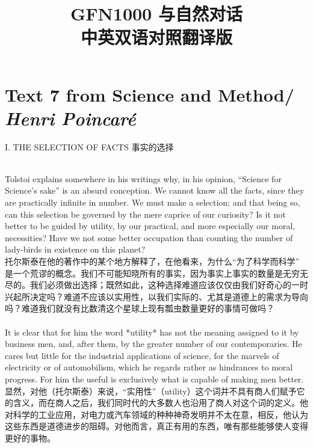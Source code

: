 \documentclass{article}
\begin{document}
\title{\textbf{
GFN1000 与自然对话\\
中英双语对照翻译版
}} %
\date{}
\maketitle %

\setcounter{secnumdepth}{0} %
\tableofcontents
\newpage
\section{Text 7 from Science and Method/ \textit{Henri Poincaré}}
\begin{center}
I. THE SELECTION OF FACTS 事实的选择 
\end{center}

\\
Tolstoi explains somewhere in his writings why, in his opinion, “Science for Science’s sake” is an absurd conception. We cannot know all the facts, since they are practically infinite in number. We must make a selection; and that being so, can this selection be governed by the mere caprice of our curiosity? Is it not better to be guided by utility, by our practical, and more especially our moral, necessities? Have we not some better occupation than counting the number of lady-birds in existence on this planet?\\
托尔斯泰在他的著作中的某个地方解释了，在他看来，为什么“为了科学而科学” 是一个荒谬的概念。我们不可能知晓所有的事实，因为事实上事实的数量是无穷无尽的。我们必须做出选择；既然如此，这种选择难道应该仅仅由我们好奇心的一时兴起所决定吗？难道不应该以实用性，以我们实际的、尤其是道德上的需求为导向吗？难道我们就没有比数清这个星球上现有瓢虫数量更好的事情可做吗？ \\

\\
It is clear that for him the word *utility* has not the meaning assigned to it by business men, and, after them, by the greater number of our contemporaries. He cares but little for the industrial applications of science, for the marvels of electricity or of automobilism, which he regards rather as hindrances to moral progress. For him the useful is exclusively what is capable of making men better.\\
显然，对他（托尔斯泰）来说，“实用性”（utility）这个词并不具有商人们赋予它的含义，而在商人之后，我们同时代的大多数人也沿用了商人对这个词的定义。他对科学的工业应用，对电力或汽车领域的种种神奇发明并不太在意，相反，他认为这些东西是道德进步的阻碍。对他而言，真正有用的东西，唯有那些能够使人变得更好的事物。 \\ 
\end{document}
